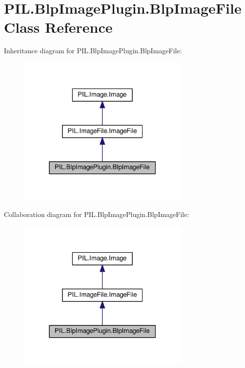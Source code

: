 \hypertarget{classPIL_1_1BlpImagePlugin_1_1BlpImageFile}{}\section{P\+I\+L.\+Blp\+Image\+Plugin.\+Blp\+Image\+File Class Reference}
\label{classPIL_1_1BlpImagePlugin_1_1BlpImageFile}


Inheritance diagram for P\+I\+L.\+Blp\+Image\+Plugin.\+Blp\+Image\+File\+:
\nopagebreak
\begin{figure}[H]
\begin{center}
\leavevmode
\includegraphics[width=243pt]{classPIL_1_1BlpImagePlugin_1_1BlpImageFile__inherit__graph}
\end{center}
\end{figure}


Collaboration diagram for P\+I\+L.\+Blp\+Image\+Plugin.\+Blp\+Image\+File\+:
\nopagebreak
\begin{figure}[H]
\begin{center}
\leavevmode
\includegraphics[width=243pt]{classPIL_1_1BlpImagePlugin_1_1BlpImageFile__coll__graph}
\end{center}
\end{figure}

